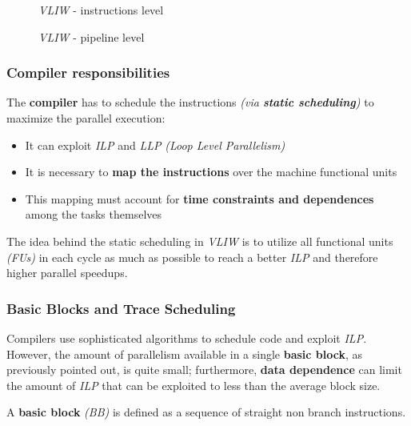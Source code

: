 \documentclass[english]{article}
\begin{document}
\begin{figure}[htbp]
  \bigskip
  \centering
  \caption{\textit{VLIW} - instructions level}
  \label{fig:vliw-instruction-level}
  \bigskip
\end{figure}

\begin{figure}[htbp]
  \bigskip
  \centering
  \caption{\textit{VLIW} - pipeline level}
  \label{fig:vliw-pipeline-level}
  \bigskip
\end{figure}

\subsubsection{Compiler responsibilities}

The \textbf{compiler} has to schedule the instructions \textit{(via \textbf{static scheduling})} to maximize the parallel execution:

\begin{itemize}
  \item It can exploit \textit{ILP} and \textit{LLP} \textit{(Loop Level Parallelism)}
  \item It is necessary to \textbf{map the instructions} over the machine functional units
  \item This mapping must account for \textbf{time constraints and dependences} among the tasks themselves
\end{itemize}

The idea behind the static scheduling in \textit{VLIW} is to utilize all functional units \textit{(FUs)} in each cycle as much as possible to reach a better \textit{ILP} and therefore higher parallel speedups.

\subsubsection{Basic Blocks and Trace Scheduling}
\label{sec:trace-scheduling}

Compilers use sophisticated algorithms to schedule code and exploit \textit{ILP}.
However, the amount of parallelism available in a single \textbf{basic block}, as previously pointed out, is quite small; furthermore, \textbf{data dependence} can limit the amount of \textit{ILP} that can be exploited to less than the average block size.

A \textbf{basic block} \textit{(BB)} is defined as a sequence of straight non branch instructions.
\end{document}
